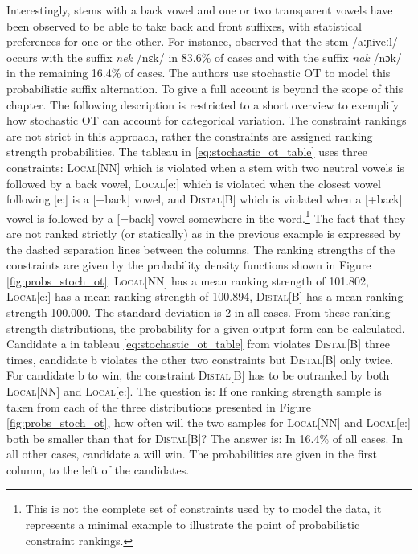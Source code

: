 \largerpage
Interestingly, stems with a back vowel and one or two transparent vowels have been observed to be able to take back and front suffixes, with statistical preferences for one or the other. For instance, \citet{HayesLonde2006} observed that the stem /aːɲiveːl/ occurs with the suffix \emph{nek} /nɛk/ in 83.6\% of cases and with the suffix \emph{nak} /nɔk/ in the remaining 16.4\% of cases. The authors use stochastic OT \citep{Boersma1997,BoersmaHayes2001} to model this probabilistic suffix alternation. To give a full account is beyond the scope of this chapter. The following description is restricted to a short overview to exemplify how stochastic OT can account for categorical variation. The constraint rankings are not strict in this approach, rather the constraints are assigned ranking strength probabilities. The tableau in \ref{eq:stochastic_ot_table} uses three constraints: \textsc{Local[NN]} which is violated when a stem with two neutral vowels is followed by a back vowel, \textsc{Local}[e:] which is violated when the closest vowel following [e:] is a [+back] vowel, and \textsc{Distal[B]} which is violated when a [+back] vowel is followed by a [$-$back] vowel somewhere in the word.\footnote{This is not the complete set of constraints used by \citet{HayesLonde2006} to model the data, it represents a minimal example to illustrate the point of probabilistic constraint rankings.} The fact that they are not ranked strictly (or statically) as in the previous example is expressed by the dashed separation lines between the columns. The ranking strengths of the constraints are given by the probability density functions shown in Figure \ref{fig:probs_stoch_ot}. \textsc{Local[NN]} has a mean ranking strength of 101.802, \textsc{Local}[e:] has a mean ranking strength of 100.894, \textsc{Distal[B]} has a mean ranking strength 100.000. The standard deviation is 2 in all cases. From these ranking strength distributions, the probability for a given output form can be calculated. Candidate a in tableau \ref{eq:stochastic_ot_table} from \citet[81]{HayesLonde2006} violates \textsc{Distal[B]} three times, candidate b violates the other two constraints but \textsc{Distal[B]} only twice. For candidate b to win, the constraint \textsc{Distal[B]} has to be outranked by both \textsc{Local[NN]} and \textsc{Local}[e:]. The question is: If one ranking strength sample is taken from each of the three distributions presented in Figure \ref{fig:probs_stoch_ot}, how often will the two samples for \textsc{Local[NN]} and \textsc{Local}[e:] both be smaller than that for \textsc{Distal[B]}? The answer is: In 16.4\% of all cases. In all other cases, candidate a will win. The probabilities are given in the first column, to the left of the candidates.

